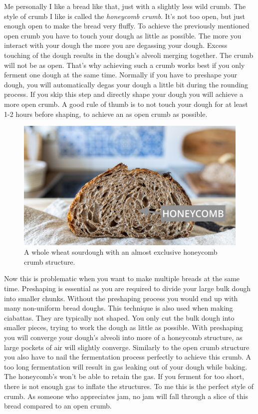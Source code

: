Me personally I like a bread like that, just with a slightly less wild crumb.
The style of crumb I like is called the {\it honeycomb crumb}. It's not too open, but
just enough open to make the bread very fluffy. To achieve the previously mentioned open crumb you
have to touch your dough as little as possible. The more you interact with your
dough the more you are degassing your dough. Excess touching of the dough
results in the dough's alveoli merging together. The crumb will not be as open.
That's why achieving such a crumb works best if you only ferment
one dough at the same time. Normally if you have to preshape your dough,
you will automatically degas your dough a little bit during the rounding process.
If you skip this step and directly shape your dough you will achieve a more open crumb.
A good rule of thumb is to not touch your dough for at least 1-2 hours before shaping,
to achieve an as open crumb as possible.

\begin{figure}
  \includegraphics[width=\textwidth]{honeycomb}
  \caption{A whole wheat sourdough with an almost exclusive honeycomb crumb structure.}
  \label{fig:honeycomb}
\end{figure}


Now this is problematic when you want to
make multiple breads at the same time. Preshaping is essential as you are required
to divide your large bulk dough into smaller chunks. Without the preshaping
process you would end up with many non-uniform bread doughs. This technique is
also used when making ciabattas. They are typically not shaped. You only cut the
bulk dough into smaller pieces, trying to work the dough as little as possible.
With preshaping you will converge your dough's alveoli into more of a honeycomb structure,
as large pockets of air will slightly converge. Similarly to the open crumb structure
you also have to nail the fermentation process perfectly to achieve this crumb.
A too long fermentation will result in gas leaking out of your dough while baking.
The honeycomb's won't be able to retain the gas. If you ferment for too short,
there is not enough gas to inflate the structures. To me this is the perfect
style of crumb. As someone who appreciates jam, no jam will fall through a slice
of this bread compared to an open crumb.

